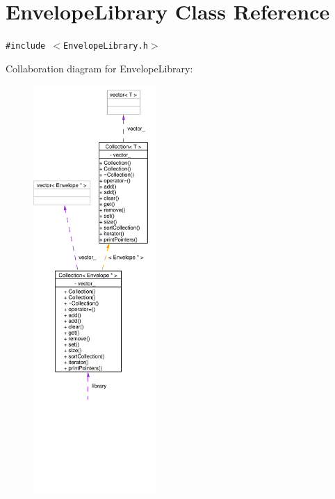 \hypertarget{classEnvelopeLibrary}{
\section{Envelope\-Library Class Reference}
\label{classEnvelopeLibrary}
}
{\tt \#include $<$Envelope\-Library.h$>$}

Collaboration diagram for Envelope\-Library:\begin{figure}[H]
\begin{center}
\leavevmode
\includegraphics[width=131pt]{classEnvelopeLibrary__coll__graph}
\end{center}
\end{figure}
